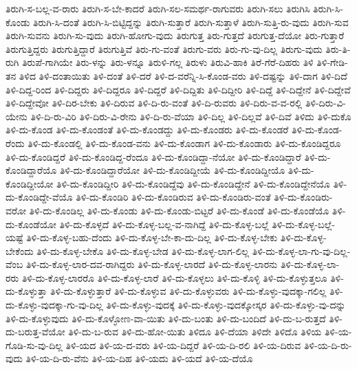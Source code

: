 {ತಿರುಗಿ-ಸ-ಬಲ್ಲ-ವ-ರಾರು
ತಿರುಗಿ-ಸ-ಬೇ-ಕಾದರೆ
ತಿರುಗಿ-ಸಲ-ಸಮರ್ಥ-ರಾಗುವರು
ತಿರುಗಿ-ಸಲು
ತಿರುಗಿಸಿ
ತಿರುಗಿ-ಸಿ-ಕೊಂಡು
ತಿರುಗಿ-ಸಿ-ದಂತೆ
ತಿರುಗಿ-ಸಿ-ಬಿಟ್ಟಿದ್ದನ್ನು
ತಿರುಗಿ-ಸುತ್ತಾರೆ
ತಿರುಗಿ-ಸುತ್ತಾಳೆ
ತಿರುಗಿ-ಸುತ್ತಿ-ರು-ವುದು
ತಿರುಗಿ-ಸುವ
ತಿರುಗಿ-ಸುವನು
ತಿರುಗಿ-ಸು-ವುದು
ತಿರುಗಿ-ಹೋಗು-ವುದು
ತಿರುಗುತ್ತ
ತಿರು-ಗುತ್ತದೆ
ತಿರುಗುತ್ತ-ದೆಯೋ
ತಿರು-ಗುತ್ತಾರೆ
ತಿರುಗುತ್ತಿದ್ದರು
ತಿರುಗುತ್ತಿದ್ದಾರೆ
ತಿರುಗುತ್ತಿವೆ
ತಿರು-ಗು-ವಂತೆ
ತಿರುಗು-ವರು
ತಿರು-ಗು-ವು-ದಿಲ್ಲ
ತಿರುಗು-ವುದು
ತಿರು-ತಿ-ರುಗಿ
ತಿರುಪೆ-ಗಾಗಿಯೇ
ತಿರು-ಳನ್ನು
ತಿರು-ಳನ್ನೂ
ತಿರುಳಿ-ಗಲ್ಲ
ತಿರುಳು
ತಿರುವಿ-ಹಾಕಿ
ತಿರೆ-ಗೆರೆ-ದಿಹರು
ತಿಳಿ
ತಿಳಿ-ಗೇಡಿ-ತನ
ತಿಳಿದ
ತಿಳಿ-ದಂತಾಯಿತು
ತಿಳಿ-ದಂತೆ
ತಿಳಿ-ದರೆ
ತಿಳಿ-ದ-ವರೆನ್ನಿ-ಸಿ-ಕೊಂಡ-ವರು
ತಿಳಿ-ದಷ್ಟನ್ನು
ತಿಳಿ-ದಾಗ
ತಿಳಿ-ದಿದೆ
ತಿಳಿ-ದಿದ್ದ-ರಿಂದ
ತಿಳಿ-ದಿದ್ದರು
ತಿಳಿ-ದಿದ್ದರೂ
ತಿಳಿ-ದಿದ್ದರೆ
ತಿಳಿ-ದಿದ್ದಿತು
ತಿಳಿ-ದಿದ್ದೀರಿ
ತಿಳಿ-ದಿದ್ದೆ
ತಿಳಿ-ದಿದ್ದೇನೆ
ತಿಳಿ-ದಿದ್ದೇವೆ
ತಿಳಿ-ದಿದ್ದೇವೋ
ತಿಳಿ-ದಿರ-ಬೇಕು
ತಿಳಿ-ದಿರುವ
ತಿಳಿ-ದಿ-ರು-ವಂತೆ
ತಿಳಿ-ದಿ-ರುವರು
ತಿಳಿ-ದಿರು-ವ-ವ-ರಲ್ಲಿ
ತಿಳಿ-ದಿರು-ವಿ-ಯೇನು
ತಿಳಿ-ದಿ-ರು-ವಿರಿ
ತಿಳಿ-ದಿರು-ವಿ-ರೇನು
ತಿಳಿ-ದಿ-ರು-ವೆಯಾ
ತಿಳಿ-ದಿಲ್ಲ
ತಿಳಿ-ದಿಲ್ಲವೆ
ತಿಳಿ-ದಿವೆ
ತಿಳಿದು
ತಿಳಿ-ದುಕೊ
ತಿಳಿ-ದು-ಕೊಂಡ
ತಿಳಿ-ದು-ಕೊಂಡಂತೆ
ತಿಳಿ-ದು-ಕೊಂಡದ್ದು
ತಿಳಿ-ದು-ಕೊಂಡರು
ತಿಳಿ-ದು-ಕೊಂಡರೆ
ತಿಳಿ-ದು-ಕೊಂಡ-ರೆಂದು
ತಿಳಿ-ದು-ಕೊಂಡಲ್ಲಿ
ತಿಳಿ-ದು-ಕೊಂಡ-ವನು
ತಿಳಿ-ದು-ಕೊಂಡಾಗ
ತಿಳಿ-ದು-ಕೊಂಡಾರು
ತಿಳಿ-ದು-ಕೊಂಡಿದ್ದರೂ
ತಿಳಿ-ದು-ಕೊಂಡಿದ್ದರೆ
ತಿಳಿ-ದು-ಕೊಂಡಿದ್ದ-ರೆಂದೂ
ತಿಳಿ-ದು-ಕೊಂಡಿದ್ದಾ-ನೆಯೋ
ತಿಳಿ-ದು-ಕೊಂಡಿದ್ದಾರೆ
ತಿಳಿ-ದು-ಕೊಂಡಿದ್ದಾರೆಯೊ
ತಿಳಿ-ದು-ಕೊಂಡಿದ್ದಾರೆಯೋ
ತಿಳಿ-ದು-ಕೊಂಡಿದ್ದೀಯೆ
ತಿಳಿ-ದು-ಕೊಂಡಿದ್ದೀಯೊ
ತಿಳಿ-ದು-ಕೊಂಡಿದ್ದೀಯೋ
ತಿಳಿ-ದು-ಕೊಂಡಿದ್ದೀರಿ
ತಿಳಿ-ದು-ಕೊಂಡಿದ್ದೆವು
ತಿಳಿ-ದು-ಕೊಂಡಿದ್ದೇನೆ
ತಿಳಿ-ದು-ಕೊಂಡಿದ್ದೇನೆಯೊ
ತಿಳಿ-ದು-ಕೊಂಡಿದ್ದೇ-ವೆಯೊ
ತಿಳಿ-ದು-ಕೊಂಡಿರಿ
ತಿಳಿ-ದು-ಕೊಂಡಿರುವ
ತಿಳಿ-ದು-ಕೊಂಡಿರು-ವಂತೆ
ತಿಳಿ-ದು-ಕೊಂಡಿರು-ವರೋ
ತಿಳಿ-ದು-ಕೊಂಡಿಲ್ಲ
ತಿಳಿ-ದು-ಕೊಂಡು
ತಿಳಿ-ದು-ಕೊಂಡು-ಬಿಟ್ಟರೆ
ತಿಳಿ-ದು-ಕೊಂಡೆ
ತಿಳಿ-ದು-ಕೊಂಡೆಯೊ
ತಿಳಿ-ದು-ಕೊಂಡೆಯೋ
ತಿಳಿ-ದು-ಕೊಳ್ಳದೆ
ತಿಳಿ-ದು-ಕೊಳ್ಳ-ಬಲ್ಲ-ವ-ನಾಗಿದ್ದೆ
ತಿಳಿ-ದು-ಕೊಳ್ಳ-ಬಲ್ಲೆ
ತಿಳಿ-ದು-ಕೊಳ್ಳ-ಬಲ್ಲೆ-ಯಷ್ಟೆ
ತಿಳಿ-ದು-ಕೊಳ್ಳ-ಬಹು-ದೆಂದು
ತಿಳಿ-ದು-ಕೊಳ್ಳ-ಬೇ-ಕಾ-ದು-ದಿಲ್ಲ
ತಿಳಿ-ದು-ಕೊಳ್ಳ-ಬೇಕು
ತಿಳಿ-ದು-ಕೊಳ್ಳ-ಬೇಕೆಂದು
ತಿಳಿ-ದು-ಕೊಳ್ಳ-ಬೇಕೊ
ತಿಳಿ-ದು-ಕೊಳ್ಳ-ಬೇಡ
ತಿಳಿ-ದು-ಕೊಳ್ಳ-ಲಾಗ-ಲಿಲ್ಲ
ತಿಳಿ-ದು-ಕೊಳ್ಳ-ಲಾ-ಗು-ವು-ದಿಲ್ಲ-ವೆಂಬ
ತಿಳಿ-ದು-ಕೊಳ್ಳ-ಲಾರ-ದವ-ರಾಗಿದ್ದರು
ತಿಳಿ-ದು-ಕೊಳ್ಳ-ಲಾರದೆ
ತಿಳಿ-ದು-ಕೊಳ್ಳ-ಲಾರನು
ತಿಳಿ-ದು-ಕೊಳ್ಳ-ಲಾ-ರರು
ತಿಳಿ-ದು-ಕೊಳ್ಳ-ಲಾರರೊ
ತಿಳಿ-ದು-ಕೊಳ್ಳ-ಲಾರೆ
ತಿಳಿ-ದು-ಕೊಳ್ಳಲು
ತಿಳಿ-ದು-ಕೊಳ್ಳಿ
ತಿಳಿ-ದು-ಕೊಳ್ಳುತ್ತಲೂ
ತಿಳಿ-ದು-ಕೊಳ್ಳುತ್ತಾ
ತಿಳಿ-ದು-ಕೊಳ್ಳುತ್ತಾರೆ
ತಿಳಿ-ದು-ಕೊಳ್ಳುವ
ತಿಳಿ-ದು-ಕೊಳ್ಳುವರು
ತಿಳಿ-ದು-ಕೊಳ್ಳು-ವುದಕ್ಕಾ-ಗಲಿಲ್ಲ
ತಿಳಿ-ದು-ಕೊಳ್ಳು-ವುದಕ್ಕಾ-ಗು-ವು-ದಿಲ್ಲ
ತಿಳಿ-ದು-ಕೊಳ್ಳು-ವುದಕ್ಕೆ
ತಿಳಿ-ದು-ಕೊಳ್ಳು-ವುದಕ್ಕೋಸ್ಕರ
ತಿಳಿ-ದು-ಕೊಳ್ಳು-ವು-ದನ್ನು
ತಿಳಿ-ದು-ಕೊಳ್ಳುವುದು
ತಿಳಿ-ದು-ಕೊಳ್ಳೋಣ-ವಾ-ಯಿತು
ತಿಳಿ-ದು-ಬಂತು
ತಿಳಿ-ದು-ಬಂದಿದೆ
ತಿಳಿ-ದು-ಬ-ರುತ್ತದೆ
ತಿಳಿ-ದು-ಬರುತ್ತ-ವೆಯೋ
ತಿಳಿ-ದು-ಬ-ರುವ
ತಿಳಿ-ದು-ಹೋ-ಯಿತು
ತಿಳಿದೂ
ತಿಳಿ-ದೆಯಾ
ತಿಳಿದೇ
ತಿಳಿದೊ
ತಿಳಿಯ
ತಿಳಿ-ಯ-ಗೊಡಿ-ಸು-ವು-ದಿಲ್ಲ
ತಿಳಿ-ಯದ
ತಿಳಿ-ಯ-ದ-ವರು
ತಿಳಿ-ಯ-ದಿದ್ದರೆ
ತಿಳಿ-ಯ-ದಿ-ರಲಿ
ತಿಳಿ-ಯ-ದಿರುವ
ತಿಳಿ-ಯ-ದಿ-ರು-ವುದು
ತಿಳಿ-ಯ-ದಿ-ರು-ವೆನು
ತಿಳಿ-ಯ-ದಿಹ
ತಿಳಿ-ಯದು
ತಿಳಿ-ಯದೆ
ತಿಳಿ-ಯ-ದೆಯೊ
}
